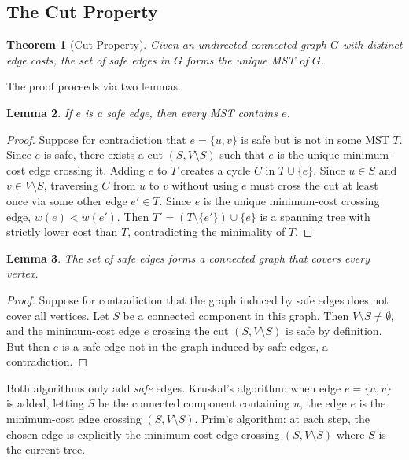 \documentclass[11pt, a4paper, notitlepage]{report}
\newtheorem{theorem}{Theorem}[section]
\newtheorem{lemma}[theorem]{Lemma}
\theoremstyle{definition}
\theoremstyle{remark}
\begin{document}
\subsection{The Cut Property}
\label{subsec:cut-property}

\begin{theorem}[Cut Property]
\label{thm:cut-property}
Given an undirected connected graph $G$ with distinct edge costs, the set of safe edges in $G$ forms the unique MST of $G$.
\end{theorem}

The proof proceeds via two lemmas.

\begin{lemma}
\label{lem:safe-in-mst}
If $e$ is a safe edge, then every MST contains $e$.
\end{lemma}

\begin{proof}
Suppose for contradiction that $e = \{u,v\}$ is safe but is not in some MST $T$. Since $e$ is safe, there exists a cut $(S, V \setminus S)$ such that $e$ is the unique minimum-cost edge crossing it. Adding $e$ to $T$ creates a cycle $C$ in $T \cup \{e\}$. Since $u \in S$ and $v \in V \setminus S$, traversing $C$ from $u$ to $v$ without using $e$ must cross the cut at least once via some other edge $e' \in T$. Since $e$ is the unique minimum-cost crossing edge, $w(e) < w(e')$. Then $T' = (T \setminus \{e'\}) \cup \{e\}$ is a spanning tree with strictly lower cost than $T$, contradicting the minimality of $T$.
\end{proof}

\begin{lemma}
\label{lem:safe-cover}
The set of safe edges forms a connected graph that covers every vertex.
\end{lemma}

\begin{proof}
Suppose for contradiction that the graph induced by safe edges does not cover all vertices. Let $S$ be a connected component in this graph. Then $V \setminus S \neq \emptyset$, and the minimum-cost edge $e$ crossing the cut $(S, V \setminus S)$ is safe by definition. But then $e$ is a safe edge not in the graph induced by safe edges, a contradiction.
\end{proof}

\begin{keyresult}[title={Key Result: Why Kruskal's and Prim's Work}]
Both algorithms only add \emph{safe} edges. Kruskal's algorithm: when edge $e = \{u,v\}$ is added, letting $S$ be the connected component containing $u$, the edge $e$ is the minimum-cost edge crossing $(S, V \setminus S)$. Prim's algorithm: at each step, the chosen edge is explicitly the minimum-cost edge crossing $(S, V \setminus S)$ where $S$ is the current tree.
\end{keyresult}
\end{document}
